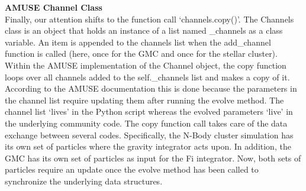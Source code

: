 \documentclass{aa}
\begin{document}



\noindent \textbf{AMUSE Channel Class} \\
Finally, our attention shifts to the function call `channels.copy()'. The Channels class is an object that holds an instance of a list named \_channels as a class variable. An item is appended to the channels list when the add\_channel function is called (here, once for the GMC and once for the stellar cluster). Within the AMUSE implementation of the Channel object, the copy function loops over all channels added to the self.\_channels list and makes a copy of it. According to the AMUSE documentation this is done because the parameters in the channel list require updating them after running the evolve method. The channel list `lives' in the Python script whereas the evolved parameters `live' in the underlying community code. The copy function call takes care of the data exchange between several codes. Specifically, the N-Body cluster simulation has its own set of particles where the gravity integrator acts upon. In addition, the GMC has its own set of particles as input for the Fi integrator. Now, both sets of particles require an update once the evolve method has been called to synchronize the underlying data structures.
\end{document}
